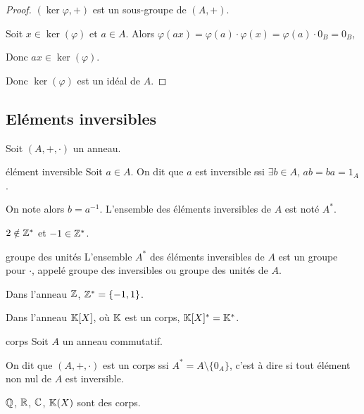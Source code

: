 \begin{proof}
    $(\ker \varphi, +)$ est un sous-groupe de $(A, +)$.

    Soit $x \in \ker(\varphi)$ et $a \in A$. Alors $\varphi(ax) = \varphi(a) \cdot \varphi(x) = \varphi(a) \cdot 0_B = 0_B$,

    Donc $ax \in \ker(\varphi)$.

    Donc $\ker(\varphi)$ est un idéal de $A$.
\end{proof}

\subsection{Eléments inversibles }

Soit $(A, +, \cdot)$ un anneau.

\begin{definition}{élément inversible}{}
    Soit $a \in A$. On dit que $a$ est inversible ssi $\exists b \in A, \, ab = ba = 1_A$.

    On note alors $b = a^{-1}$. L'ensemble des éléments inversibles de $A$ est noté $A^*$.
\end{definition}

\begin{exemple}
    $2 \notin \mathbb{Z}^*$ et $-1 \in \mathbb{Z}^*$.
\end{exemple}

\begin{theoreme}{groupe des unités}{}
    L'ensemble $A^*$ des éléments inversibles de $A$ est un groupe pour $\cdot$, appelé 
    groupe des inversibles ou groupe des unités de $A$.
\end{theoreme}

\begin{exemple}
    Dans l'anneau $\mathbb{Z}$, $\mathbb{Z}^* = \{-1, 1\}$.

    Dans l'anneau $\mathbb{K}[X]$, où $\mathbb{K}$ est un corps, $\mathbb{K}[X]^* = \mathbb{K}^*$.
\end{exemple}

\begin{definition}{corps}{}
    Soit $A$ un anneau commutatif. 
    
    On dit que $(A, +, \cdot)$ est un corps 
    ssi $A^* = A \setminus \{0_A\}$, c'est à dire si tout élément non nul de $A$ est inversible.
\end{definition}

\begin{exemple}
    $\mathbb{Q}$, $\mathbb{R}$, $\mathbb{C}$, $\mathbb{K}(X)$ sont des corps.
\end{exemple}

